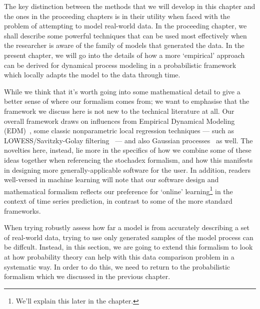The key distinction between the methods that we will develop in this chapter and the ones in the proceeding chapters is in their utility when faced with the problem of attempting to model real-world data. In the proceeding chapter, we shall describe some powerful techniques that can be used most effectively when the researcher is aware of the family of models that generated the data. In the present chapter, we will go into the details of how a more `empirical' approach can be derived for dynamical process modeling in a probabilistic framework which locally adapts the model to the data through time. 

While we think that it's worth going into some mathematical detail to give a better sense of where our formalism comes from; we want to emphasise that the framework we discuss here is not new to the technical literature at all. Our overall framework draws on influences from Empirical Dynamical Modeling (EDM)~\cite{sugihara1990nonlinear}, some classic nonparametric local regression techniques --- such as LOWESS/Savitzky-Golay filtering~\cite{savitzky1964smoothing} --- and also Gaussian processes~\cite{murphy2012machine} as well. The novelties here, instead, lie more in the specifics of how we combine some of these ideas together when referencing the stochadex formalism, and how this manifests in designing more generally-applicable software for the user. In addition, readers well-versed in machine learning will note that our software design and mathematical formalism reflects our preference for `online' learning\footnote{We'll explain this later in the chapter.} in the context of time series prediction, in contrast to some of the more standard frameworks.

When trying robustly assess how far a model is from accurately describing a set of real-world data, trying to use only generated samples of the model process can be diffcult. Instead, in this section, we are going to extend this formalism to look at how probability theory can help with this data comparison problem in a systematic way. In order to do this, we need to return to the probabilistic formalism which we discussed in the previous chapter.

